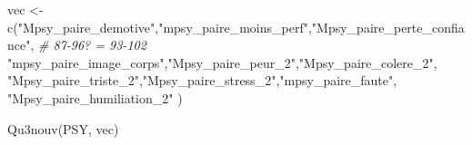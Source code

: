\documentclass[
]{article}
\newenvironment{Shaded}{\begin{snugshade}}{\end{snugshade}}
\newcommand{\CommentTok}[1]{\textcolor[rgb]{0.56,0.35,0.01}{\textit{#1}}}
\newcommand{\FunctionTok}[1]{\textcolor[rgb]{0.00,0.00,0.00}{#1}}
\newcommand{\NormalTok}[1]{#1}
\newcommand{\OtherTok}[1]{\textcolor[rgb]{0.56,0.35,0.01}{#1}}
\newcommand{\StringTok}[1]{\textcolor[rgb]{0.31,0.60,0.02}{#1}}
\begin{document}
\begin{Shaded}
\begin{Highlighting}[]
\NormalTok{vec }\OtherTok{\textless{}{-}} \FunctionTok{c}\NormalTok{(}\StringTok{"Mpsy\_paire\_demotive"}\NormalTok{,}\StringTok{"mpsy\_paire\_moins\_perf"}\NormalTok{,}\StringTok{"Mpsy\_paire\_perte\_confiance"}\NormalTok{,  }\CommentTok{\# 87{-}96? = 93{-}102}
    \StringTok{"mpsy\_paire\_image\_corps"}\NormalTok{,}\StringTok{"Mpsy\_paire\_peur\_2"}\NormalTok{,}\StringTok{"Mpsy\_paire\_colere\_2"}\NormalTok{,}
    \StringTok{"Mpsy\_paire\_triste\_2"}\NormalTok{,}\StringTok{"Mpsy\_paire\_stress\_2"}\NormalTok{,}\StringTok{"mpsy\_paire\_faute"}\NormalTok{,}
    \StringTok{"Mpsy\_paire\_humiliation\_2"}                                  
\NormalTok{     )}

\FunctionTok{Qu3nouv}\NormalTok{(PSY, vec)}
\end{Highlighting}
\end{Shaded}
\end{document}

